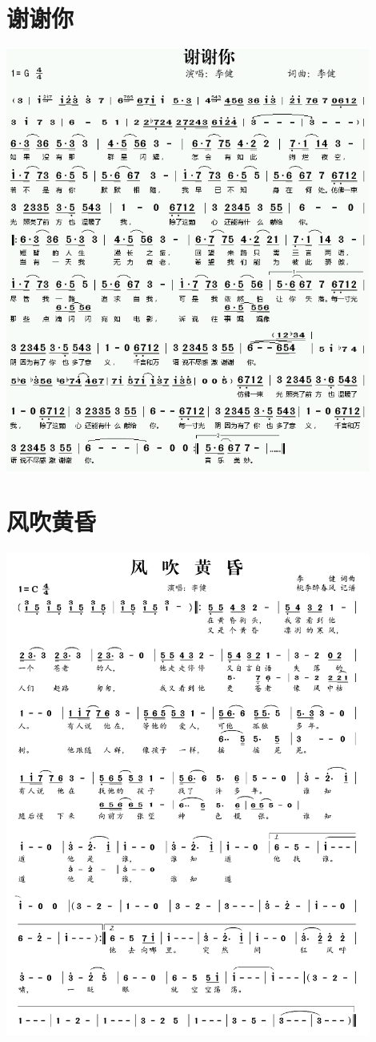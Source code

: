 \documentclass[cn,pad,twocol]{elegantbook}
\begin{document}
\section{谢谢你} \includegraphics[width=0.9\textwidth]{rpi400/20210212李健谢谢你.png}
\section{风吹黄昏} \includegraphics[width=0.9\textwidth]{rpi400/20210212李健风吹黄昏.png}
\end{document}
